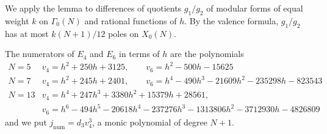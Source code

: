 \documentclass[11pt,a4paper]{article}
\theoremstyle{definition}
\theoremstyle{remark}
\numberwithin{equation}{section}
\begin{document}
We apply the lemma to differences of quotients $g_1/g_2$ of modular forms of
equal weight $k$ on $\Gamma_0(N)$ and rational functions of $h$. By the
valence formula, $g_1/g_2$ has at most $k(N+1)/12$ poles on $X_0(N)$.

The numerators of $E_4$ and $E_6$ in terms of $h$ are the polynomials
\begin{equation}\label{eq:v46}
\begin{array}{l|l}
N=5 & v_4=h^2+250h+3125,\qquad v_6=h^2-500h-15625\\[2pt]
N=7 & v_4=h^2+245h+2401,\qquad v_6=h^4-490h^3-21609h^2-235298h-823543\\[2pt]
N=13 & v_4=h^4+247h^3+3380h^2+15379h+28561,\\
     & v_6=h^6-494h^5-20618h^4-237276h^3-1313806h^2-3712930h-4826809
\end{array}
\end{equation}
and we put $j_{\mathrm{num}}=d_3v_4^3$, a monic polynomial of degree $N+1$.
\end{document}
